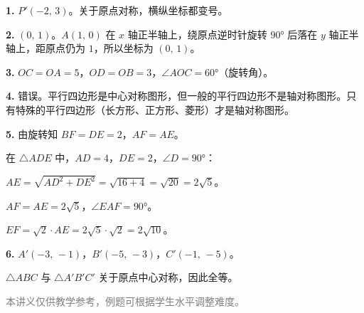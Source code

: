 \documentclass[12pt, a4paper]{ctexart}
\begin{document}
\begin{knowledgebox}[参考答案]

\textbf{1.} $P'(-2,\, 3)$。关于原点对称，横纵坐标都变号。

\medskip
\textbf{2.} $(0,\, 1)$。$A(1,\, 0)$ 在 $x$ 轴正半轴上，绕原点逆时针旋转 $90°$ 后落在 $y$ 轴正半轴上，距原点仍为 $1$，所以坐标为 $(0,\, 1)$。

\medskip
\textbf{3.} $OC = OA = 5$，$OD = OB = 3$，$\angle AOC = 60°$（旋转角）。

\medskip
\textbf{4.} 错误。平行四边形是中心对称图形，但一般的平行四边形不是轴对称图形。只有特殊的平行四边形（长方形、正方形、菱形）才是轴对称图形。

\medskip
\textbf{5.} 由旋转知 $BF = DE = 2$，$AF = AE$。

在 $\triangle ADE$ 中，$AD = 4$，$DE = 2$，$\angle D = 90°$：

$AE = \sqrt{AD^2 + DE^2} = \sqrt{16 + 4} = \sqrt{20} = 2\sqrt{5}$。

$AF = AE = 2\sqrt{5}$，$\angle EAF = 90°$。

$EF = \sqrt{2} \cdot AE = 2\sqrt{5} \cdot \sqrt{2} = 2\sqrt{10}$。

\medskip
\textbf{6.} $A'(-3,\, -1)$，$B'(-5,\, -3)$，$C'(-1,\, -5)$。

$\triangle ABC$ 与 $\triangle A'B'C'$ 关于原点中心对称，因此全等。

\end{knowledgebox}

\vfill
\begin{center}
\small\textcolor{gray}{本讲义仅供教学参考，例题可根据学生水平调整难度。}
\end{center}
\end{document}
